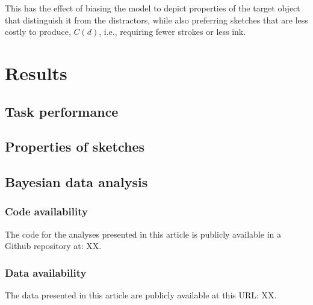\documentclass[manuscript]{stjour}
\begin{document}
This has the effect of biasing the model to depict properties of the target object that distinguish it from the distractors, while also preferring sketches that are less costly to produce, $C(d)$, i.e., requiring fewer strokes or less ink.


\section*{Results}


\subsection*{Task performance}

\subsection*{Properties of sketches}

\subsection*{Bayesian data analysis}



\subsubsection*{Code availability} The code for the analyses presented in this article is publicly available in a Github repository at: XX.

\subsubsection*{Data availability} The data presented in this article are publicly available at this URL: XX.


% 



\end{document}
